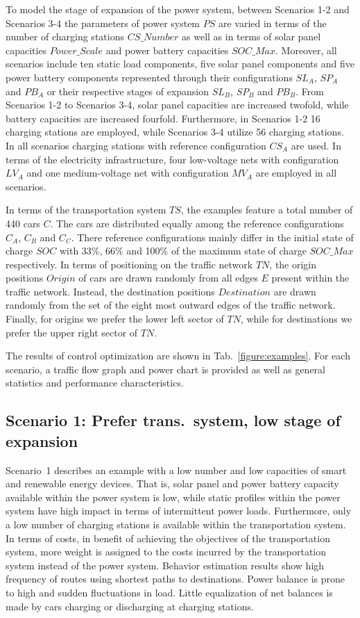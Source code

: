 To model the stage of expansion of the power system, between Scenarios 1-2 and Scenarios 3-4 the parameters of power system $PS$ are varied in terms of the number of charging stations $CS\_Number$ as well as in terms of solar panel capacities $Power\_Scale$ and power battery capacities $SOC\_Max$. Moreover, all scenarios include ten static load components, five solar panel components and five power battery components represented through their configurations $SL_{A}$, $SP_{A}$ and $PB_{A}$ or their respective stages of expansion $SL_{B}$, $SP_{B}$ and $PB_{B}$. From Scenarios 1-2 to Scenarios 3-4, solar panel capacities are increased twofold, while battery capacities are increased fourfold. Furthermore, in Scenarios 1-2 16 charging stations are employed, while Scenarios 3-4 utilize 56 charging stations. In all scenarios charging stations with reference configuration $CS_{A}$ are used. In terms of the electricity infrastructure, four low-voltage nets with configuration $LV_{A}$ and one medium-voltage net with configuration $MV_{A}$ are employed in all scenarios. 

In terms of the transportation system $TS$, the examples feature a total number of 440 cars $C$. The cars are distributed equally among the reference configurations $C_{A}$, $C_{B}$ and $C_{C}$. There reference configurations mainly differ in the initial state of charge $SOC$ with 33\%, 66\% and 100\% of the maximum state of charge $SOC\_Max$ respectively. In terms of positioning on the traffic network $TN$, the origin positions $Origin$ of cars are drawn randomly from all edges $E$ present within the traffic network. Instead, the destination positions $Destination$ are drawn randomly from the set of the eight most outward edges of the traffic network. Finally, for origins we prefer the lower left sector of $TN$, while for destinations we prefer the upper right sector of $TN$.

The results of control optimization are shown in Tab.~\ref{figure:examples}. For each scenario, a traffic flow graph and power chart is provided as well as general statistics and performance characteristics.

\subsection*{Scenario 1: Prefer trans.\ system, low stage of expansion}

Scenario~1 describes an example with a low number and low capacities of smart and renewable energy devices. That is, solar panel and power battery capacity available within the power system is low, while static profiles within the power system have high impact in terms of intermittent power loads. Furthermore, only a low number of charging stations is available within the transportation system. In terms of costs, in benefit of achieving the objectives of the transportation system, more weight is assigned to the costs incurred by the transportation system instead of the power system. Behavior estimation results show high frequency of routes using shortest paths to destinations. Power balance is prone to high and sudden fluctuations in load. Little equalization of net balances is made by cars charging or discharging at charging stations.


